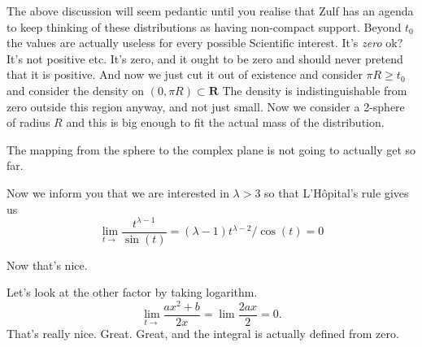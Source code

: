 \documentclass{amsart}
\begin{document}
The above discussion will seem pedantic until you realise that Zulf has an agenda to keep thinking of these distributions as having non-compact support.  Beyond $t_0$ the values are actually useless for every possible Scientific interest. It's {\em zero} ok?  It's not positive etc. It's zero, and it ought to be zero and should never pretend that it is positive.  And now we just cut it out of existence and consider $\pi R\ge t_0$ and consider the density on $(0,\pi R) \subset \mathbf{R}$  The density is indistinguishable from zero outside this region anyway, and not just small.  Now we consider a 2-sphere of radius $R$ and this is big enough to fit the actual mass of the distribution.

The mapping from the sphere to the complex plane is not going to actually get so far.

Now we inform you that we are interested in $\lambda>3$ so that L'H\^opital's rule gives us
\[
\lim_{t\rightarrow}\frac{t^{\lambda-1}}{\sin(t)} = (\lambda - 1) t^{\lambda-2}/\cos(t) = 0
\]

Now that's nice.  

Let's look at the other factor by taking logarithm.
\[
\lim_{t\rightarrow} \frac{ax^2+b}{2x} = \lim \frac{2ax}{2}= 0.
\]
That's really nice.  Great.  Great, and the integral is actually defined from zero.



\begin{thebibliography}{CCCC}
\end{thebibliography}
\end{document}
